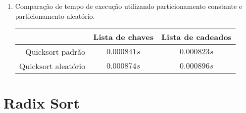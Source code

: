 \documentclass[10pt,a4paper]{article}
\begin{document}
\begin{enumerate}
      \item Comparação de tempo de execução utilizando particionamento constante
      e particionamento aleatório.

        \begin{tabular}{ r | c | c |}
                              & Lista de chaves & Lista de cadeados \\ \hline
          Quicksort padrão    & $0.000841s$     & $0.000823s$       \\ \hline
          Quicksort aleatório & $0.000874s$     & $0.000896s$       \\ \hline
        \end{tabular}

		\end{enumerate}

		
	\section{Radix Sort}
	
\end{document}
